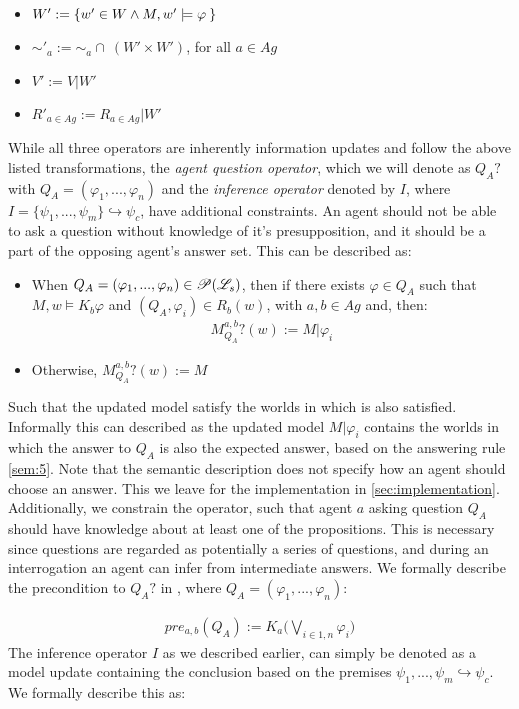 \begin{itemize}
    \item $W' := \left\{ w' \in W \land M, w' \models \varphi\: \right\}$
    \item $\sim'_a := \sim_a \cap \:(W' \times W')$, for all $a \in Ag$
    \item $V' := V | W'$
    \item $R'_{a\in Ag} := R_{a\in Ag} | W'$
\end{itemize}
While all three operators are inherently information updates and follow the above listed transformations, the \textit{agent question operator}, which we will denote as $Q_{A}?$ with $Q_A = (\varphi_1,...,\varphi_n)$ and the \textit{inference operator} denoted by $I$, where $I = \{\psi_1,...,\psi_m \}\hookrightarrow \psi_c$, have additional constraints. An agent should not be able to ask a question without knowledge of it's presupposition, and it should be a part of the opposing agent's answer set. This can be described as:
\begin{itemize}
    \item When $Q_A = (\varphi_1,...,\varphi_n) \in \mathscr{P}(\mathscr{L}_s)$, then if there
          exists $\varphi \in Q_A$ such that $M, w \models K_b\varphi$ and $(Q_A,
              \varphi_i) \in R_b (w)$, with $a, b \in Ag$ and, then:
          \begin{align}
              M^{a,b}_{Q_A}?(w) := M |\varphi_i
          \end{align}
    \item Otherwise, $M^{a,b}_{Q_{A}}?(w) := M$
\end{itemize}
Such that the updated model satisfy the worlds in which \proposition\: is also satisfied. Informally this can described as the updated model $M|\varphi_i$ contains the worlds in which the answer to $Q_A$ is also the expected answer, based on the answering rule \cref{sem:5}. Note that the semantic description does not specify how an agent should choose an answer. This we leave for the implementation in \cref{sec:implementation}. Additionally, we constrain the operator, such that agent $a$ asking question $Q_A$ should have knowledge about at least one of the propositions. This is necessary since questions are regarded as potentially a series of questions, and during an interrogation an agent can infer from intermediate answers. We formally describe the precondition to $Q_A?$ in \dynlang, where $Q_A = (\varphi_1,...,\varphi_n)$:

\begin{gather}
    pre_{a,b}(Q_A) := K_a\Biggl(\bigvee\limits_{i\in 1,n}\varphi_i\Biggr)
\end{gather}
The inference operator $I$ as we described earlier, can simply be denoted as a model update containing the conclusion based on the premises ${\psi_1,...,\psi_m} \hookrightarrow \psi_c$. We formally describe this as:


